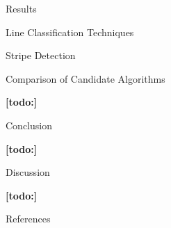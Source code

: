 \documentclass{matthijs}
\begin{document}
\begin{hoofdstuk}{Results}
\begin{paragraaf}{Line Classification Techniques}
\begin{subparagraaf}{Stripe Detection}
			\end{subparagraaf}

		\end{paragraaf}

		\begin{paragraaf}{Comparison of Candidate Algorithms}

			\textbf{[todo:]}

		\end{paragraaf}

	\end{hoofdstuk}

	\begin{hoofdstuk}{Conclusion}

		\textbf{[todo:]}

	\end{hoofdstuk}

	\begin{hoofdstuk}{Discussion}

		\textbf{[todo:]}

	\end{hoofdstuk}

	\begin{hoofdstuk}{References}

		\printbibliography[heading=none]
	
	\end{hoofdstuk}

	\clearpage
	\thispagestyle{empty}
	\addtocounter{page}{-1}
	\
	\clearpage
\end{document}
